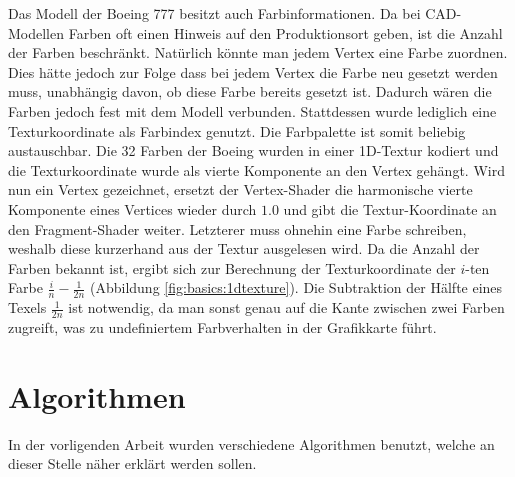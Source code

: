 Das Modell der Boeing 777 besitzt auch Farbinformationen. Da bei CAD-Modellen Farben oft einen Hinweis auf den Produktionsort geben, ist die Anzahl der Farben beschränkt. Natürlich könnte man jedem Vertex eine Farbe zuordnen. Dies hätte jedoch zur Folge dass bei jedem Vertex die Farbe neu gesetzt werden muss, unabhängig davon, ob diese Farbe bereits gesetzt ist. Dadurch wären die Farben jedoch fest mit dem Modell verbunden. Stattdessen wurde lediglich eine Texturkoordinate als Farbindex genutzt. Die Farbpalette ist somit beliebig austauschbar. Die 32 Farben der Boeing wurden in einer 1D-Textur kodiert und die Texturkoordinate wurde als vierte Komponente an den Vertex gehängt. Wird nun ein Vertex gezeichnet, ersetzt der Vertex-Shader die harmonische vierte Komponente eines Vertices wieder durch $1.0$ und gibt die Textur-Koordinate an den Fragment-Shader weiter. Letzterer muss ohnehin eine Farbe schreiben, weshalb diese kurzerhand aus der Textur ausgelesen wird. Da die Anzahl der Farben bekannt ist, ergibt sich zur Berechnung der Texturkoordinate der $i$-ten Farbe $\frac{i}{n}-\frac{1}{2n}$ (Abbildung \ref{fig:basics:1dtexture}). Die Subtraktion der Hälfte eines Texels $\frac{1}{2n}$ ist notwendig, da man sonst genau auf die Kante zwischen zwei Farben zugreift, was zu undefiniertem Farbverhalten in der Grafikkarte führt.

\section{Algorithmen}
\label{sec:basics:algos}
In der vorligenden Arbeit wurden verschiedene Algorithmen benutzt, welche an dieser Stelle näher erklärt werden sollen.

